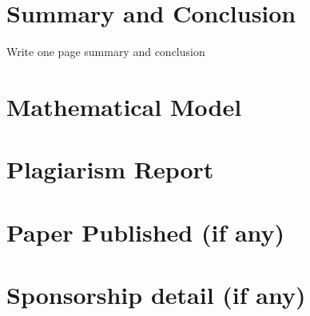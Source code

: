 \documentclass[oneside,a4paper,12pt]{report}
\begin{document}
 \chapter{Summary and Conclusion}
Write one page summary and conclusion




\begin{appendices}


\chapter{Mathematical Model}











\chapter{Plagiarism Report }


\chapter{Paper Published (if any)}

\chapter{Sponsorship detail (if any)}



\end{appendices}
\end{document}

